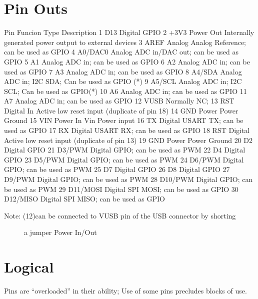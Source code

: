 \documentclass[letterpaper,10pt,english,openany,oneside]{sphinxmanual}
\begin{document}
\section{Pin Outs}
\label{\detokenize{arduino:pin-outs}}
\begin{sphinxVerbatim}[commandchars=\\\{\},numbers=left,firstnumber=1,stepnumber=1]
Pin Funcion Type Description
1  D13          Digital GPIO
2  +3V3 Power Out Internally generated power output to external devices
3  AREF         Analog           Analog Reference; can be used as GPIO
4  A0/DAC0      Analog ADC in/DAC out; can be used as GPIO
5  A1           Analog ADC in; can be used as GPIO
6  A2           Analog ADC in; can be used as GPIO
7  A3           Analog ADC in; can be used as GPIO
8  A4/SDA       Analog ADC in; I2C SDA; Can be used as GPIO (*)
9  A5/SCL       Analog ADC in; I2C SCL; Can be used as GPIO(*)
10 A6           Analog ADC in; can be used as GPIO
11 A7           Analog ADC in; can be used as GPIO
12 VUSB Normally NC;
13 RST          Digital In Active low reset input (duplicate of pin 18)
14 GND Power Power Ground
15 VIN Power In Vin Power input
16 TX           Digital USART TX; can be used as GPIO
17 RX           Digital USART RX; can be used as GPIO
18 RST          Digital Active low reset input (duplicate of pin 13)
19 GND Power Power Ground
20 D2           Digital GPIO
21 D3/PWM       Digital GPIO; can be used as PWM
22 D4           Digital GPIO
23 D5/PWM       Digital GPIO; can be used as PWM
24 D6/PWM       Digital GPIO; can be used as PWM
25 D7           Digital GPIO
26 D8           Digital GPIO
27 D9/PWM       Digital GPIO; can be used as PWM
28 D10/PWM      Digital GPIO; can be used as PWM
29 D11/MOSI     Digital SPI MOSI; can be used as GPIO
30 D12/MISO     Digital SPI MISO; can be used as GPIO
\end{sphinxVerbatim}
\begin{description}
\item[{Note: (12)can be connected to VUSB pin of the USB connector by shorting}] \leavevmode
\sphinxAtStartPar
a jumper Power In/Out

\end{description}


\section{Logical}
\label{\detokenize{arduino:logical}}
\sphinxAtStartPar
Pins are “overloaded” in their ability; Use of some pins
precludes blocks of use.
\end{document}
